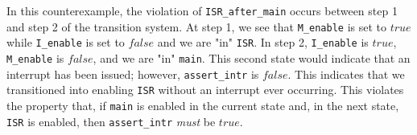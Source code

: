 \documentclass{article}
\newcommand{\code}[1]{\texttt{#1}}
\begin{document}
In this counterexample, the violation of \code{ISR\_after\_main} occurs between step 1 and step 2 of the transition system. At step 1, we see that \code{M\_enable} is set to $true$ while \code{I\_enable} is set to $false$ and we are "in" \code{ISR}. In step 2, \code{I\_enable} is $true$, \code{M\_enable} is $false$, and we are "in" \code{main}. This second state would indicate that an interrupt has been issued; however, \code{assert\_intr} is $false$. This indicates that we transitioned into enabling \code{ISR} without an interrupt ever occurring. This violates the property that, if \code{main} is enabled in the current state and, in the next state, \code{ISR} is enabled, then \code{assert\_intr} \emph{must} be $true$.
\end{document}
